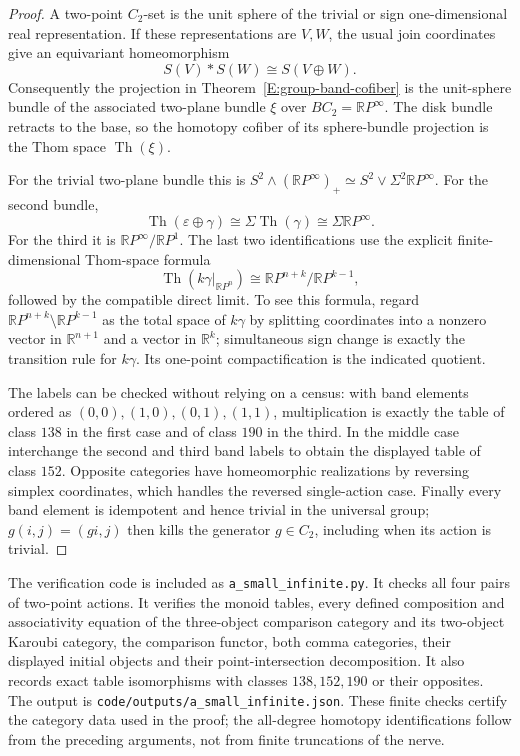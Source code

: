 \begin{proof}
A two-point $C_2$-set is the unit sphere of the trivial or sign
one-dimensional real representation. If these representations are $V,W$,
the usual join coordinates give an equivariant homeomorphism
\[
 S(V)*S(W)\cong S(V\oplus W).
\]
Consequently the projection in Theorem~\ref{E:group-band-cofiber} is
the unit-sphere bundle of the associated two-plane bundle $\xi$ over
$BC_2=\mathbb RP^\infty$. The disk bundle retracts to the base, so the
homotopy cofiber of its sphere-bundle projection is the Thom space
$\operatorname{Th}(\xi)$.

For the trivial two-plane bundle this is
$S^2\wedge(\mathbb RP^\infty)_+\simeq
S^2\vee\Sigma^2\mathbb RP^\infty$. For the second bundle,
\[
 \operatorname{Th}(\varepsilon\oplus\gamma)
 \cong\Sigma\operatorname{Th}(\gamma)
 \cong\Sigma\mathbb RP^\infty.
\]
For the third it is $\mathbb RP^\infty/\mathbb RP^1$.
The last two identifications use the explicit finite-dimensional
Thom-space formula
\[
 \operatorname{Th}(k\gamma|_{\mathbb RP^n})
 \cong\mathbb RP^{n+k}/\mathbb RP^{k-1},
\]
followed by the compatible direct limit. To see this formula, regard
$\mathbb RP^{n+k}\setminus\mathbb RP^{k-1}$ as the total space of
$k\gamma$ by splitting coordinates into a nonzero vector in
$\mathbb R^{n+1}$ and a vector in $\mathbb R^k$; simultaneous sign change
is exactly the transition rule for $k\gamma$. Its one-point
compactification is the indicated quotient.

The labels can be checked without relying on a census: with band elements
ordered as $(0,0),(1,0),(0,1),(1,1)$, multiplication is exactly the table
of class $138$ in the first case and of class $190$ in the third.
In the middle case interchange the second and third band labels to obtain
the displayed table of class $152$. Opposite categories have homeomorphic
realizations by reversing simplex coordinates, which handles the reversed
single-action case. Finally every band element is idempotent and hence
trivial in the universal group; $g(i,j)=(gi,j)$ then kills the generator
$g\in C_2$, including when its action is trivial.
\end{proof}

\begin{remark}\label{E:small-infinite-certificate}
The verification code is included as \texttt{a\_small\_infinite.py}.
It checks all four pairs of two-point actions. It verifies the monoid tables, every defined
composition and associativity equation of the three-object comparison
category and its two-object Karoubi category, the comparison functor,
both comma categories, their displayed initial objects and their
point-intersection decomposition. It also records exact table
isomorphisms with classes $138,152,190$ or their opposites.
The output is \texttt{code/outputs/a\_small\_infinite.json}.
These finite checks certify the category data used in the proof;
the all-degree homotopy identifications follow from the preceding
arguments, not from finite truncations of the nerve.
\end{remark}

